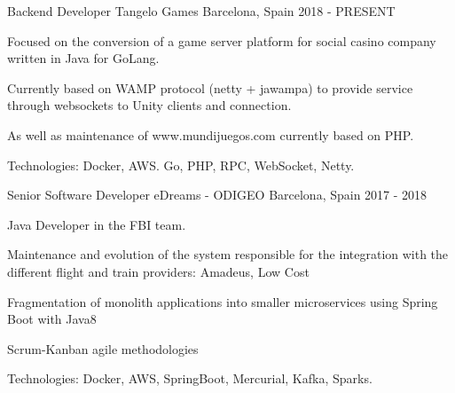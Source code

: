 

\begin{cventries}

  \cventry
    {Backend Developer} %
    {Tangelo Games} %
    {Barcelona, Spain} %
    {2018 - PRESENT} %
    {
      \begin{cvitems} %
        \item {Focused on the conversion of a game server platform for social casino company written in Java for GoLang.}
        \item {Currently based on WAMP protocol (netty + jawampa) to provide service through websockets to Unity clients and connection.}
        \item {As well as maintenance of www.mundijuegos.com currently based on PHP.}
        \item {Technologies: Docker, AWS. Go, PHP, RPC, WebSocket, Netty.}
      \end{cvitems}
    }

  \cventry
    {Senior Software Developer} %
    {eDreams - ODIGEO} %
    {Barcelona, Spain} %
    {2017 - 2018} %
    {
      \begin{cvitems} %
        \item {Java Developer in the FBI team.}
        \item {Maintenance and evolution of the system responsible for the integration with the different flight and train providers: Amadeus, Low Cost}
        \item {Fragmentation of monolith applications into smaller microservices using Spring Boot with Java8}
        \item {Scrum-Kanban agile methodologies}
        \item {Technologies: Docker, AWS, SpringBoot, Mercurial, Kafka, Sparks.}
      \end{cvitems}
    }


\end{cventries}
